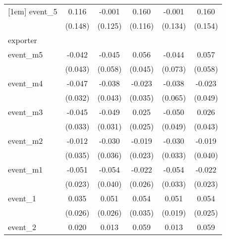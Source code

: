 {\begin{tabular}{l*{5}{c}}
[1em]
event\_5     &       0.116         &      -0.001         &       0.160         &      -0.001         &       0.160         \\
            &     (0.148)         &     (0.125)         &     (0.116)         &     (0.134)         &     (0.154)         \\
\hline
exporter    &                     &                     &                     &                     &                     \\
event\_m5    &      -0.042         &      -0.045         &       0.056         &      -0.044         &       0.057         \\
            &     (0.043)         &     (0.058)         &     (0.045)         &     (0.073)         &     (0.058)         \\
[1em]
event\_m4    &      -0.047         &      -0.038         &      -0.023         &      -0.038         &      -0.023         \\
            &     (0.032)         &     (0.043)         &     (0.035)         &     (0.065)         &     (0.049)         \\
[1em]
event\_m3    &      -0.045         &      -0.049         &       0.025         &      -0.050         &       0.026         \\
            &     (0.033)         &     (0.031)         &     (0.025)         &     (0.049)         &     (0.043)         \\
[1em]
event\_m2    &      -0.012         &      -0.030         &      -0.019         &      -0.030         &      -0.019         \\
            &     (0.035)         &     (0.036)         &     (0.023)         &     (0.033)         &     (0.040)         \\
[1em]
event\_m1    &      -0.051\sym{*}  &      -0.054         &      -0.022         &      -0.054         &      -0.022         \\
            &     (0.023)         &     (0.040)         &     (0.026)         &     (0.033)         &     (0.023)         \\
[1em]
event\_1     &       0.035         &       0.051\sym{*}  &       0.054         &       0.051\sym{**} &       0.054\sym{*}  \\
            &     (0.026)         &     (0.026)         &     (0.035)         &     (0.019)         &     (0.025)         \\
[1em]
event\_2     &       0.020         &       0.013         &       0.059         &       0.013         &       0.059         \\

\end{tabular}}
